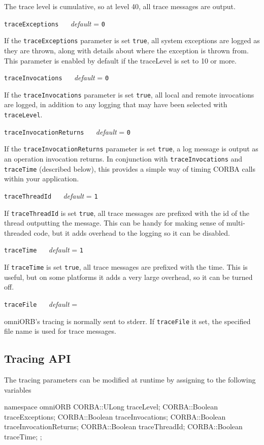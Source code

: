 \documentclass[11pt,oneside,a4paper]{book}
\makeatletter
\newcommand{\code}[1]{\texttt{#1}}
\newcommand{\confopt}[2]
  {\vspace{\baselineskip}\par\noindent\code{#1} ~~ \textit{default} =
   \code{#2}}
\renewcommand{\confopt}[2]
  {\vspace{\baselineskip}\par\noindent\code{#1} ~~ \textit{default} =
   \code{#2}\\[-1ex]\@afterheading}
\makeatother
\begin{document}
\vspace{\baselineskip}

\noindent The trace level is cumulative, so at level 40, all trace
messages are output.


\confopt{traceExceptions}{0}

If the \code{traceExceptions} parameter is set \code{true}, all system
exceptions are logged as they are thrown, along with details about
where the exception is thrown from. This parameter is enabled by
default if the traceLevel is set to 10 or more.


\confopt{traceInvocations}{0}

If the \code{traceInvocations} parameter is set \code{true}, all local
and remote invocations are logged, in addition to any logging that may
have been selected with \code{traceLevel}.


\confopt{traceInvocationReturns}{0}

If the \code{traceInvocationReturns} parameter is set \code{true}, a
log message is output as an operation invocation returns. In
conjunction with \code{traceInvocations} and \code{traceTime}
(described below), this provides a simple way of timing CORBA calls
within your application.


\confopt{traceThreadId}{1}

If \code{traceThreadId} is set \code{true}, all trace messages are
prefixed with the id of the thread outputting the message. This can be
handy for making sense of multi-threaded code, but it adds overhead to
the logging so it can be disabled.


\confopt{traceTime}{1}

If \code{traceTime} is set \code{true}, all trace messages are
prefixed with the time. This is useful, but on some platforms it adds
a very large overhead, so it can be turned off.


\confopt{traceFile}{}

omniORB's tracing is normally sent to stderr. If \code{traceFile} it
set, the specified file name is used for trace messages.


\subsection{Tracing API}

The tracing parameters can be modified at runtime by assigning to the
following variables

\begin{cxxlisting}
namespace omniORB {
  CORBA::ULong   traceLevel;
  CORBA::Boolean traceExceptions;
  CORBA::Boolean traceInvocations;
  CORBA::Boolean traceInvocationReturns;
  CORBA::Boolean traceThreadId;
  CORBA::Boolean traceTime;
};
\end{cxxlisting}
\end{document}

